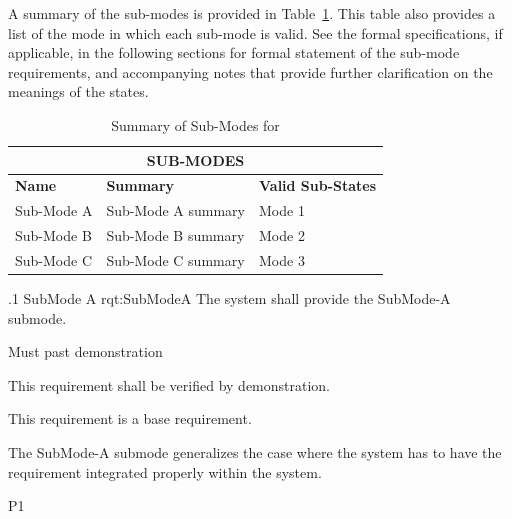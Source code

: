 
A summary of the sub-modes is provided in Table~\ref{tab:Sub-Modes}.
This table also provides a list of the mode in which each sub-mode is valid.
See the formal specifications, if applicable, in the following sections for formal statement of the sub-mode requirements, and accompanying notes that provide further clarification on the meanings of the states.
\begin{table}[htbp]
	\begin{center}
		\begin{tabular}{|p{1.0in}|p{4.0in}|p{1.0in}|}
			\hline
			\hline
			     \multicolumn{3}{|c|}{{\bf SUB-MODES}}\\
			\hline
{\bf Name} & {\bf Summary}	& {\bf Valid Sub-States}\\
			\hline
			\hline
Sub-Mode A & Sub-Mode A summary & Mode 1\\ \hline
Sub-Mode B & Sub-Mode B summary & Mode 2\\ \hline
Sub-Mode C & Sub-Mode C summary & Mode 3\\ 
			\hline
			\hline
			\end{tabular}
				\caption{Summary of Sub-Modes for \ThisSystem}
				\label{tab:Sub-Modes}
		\end{center}
\end{table}



\ONERQMTV
{\RqtNumberBase.1}
{SubMode A}
{rqt:SubModeA}
{The system shall provide the SubMode-A submode.}
{
	\item [Phase 1] Must past demonstration
}
{This requirement shall be verified by demonstration.}
{
	\item [N/A] This requirement is a base requirement.
}
{
	\item The SubMode-A submode generalizes the case where the system has to have the requirement integrated properly within the system.
}
{P1}

